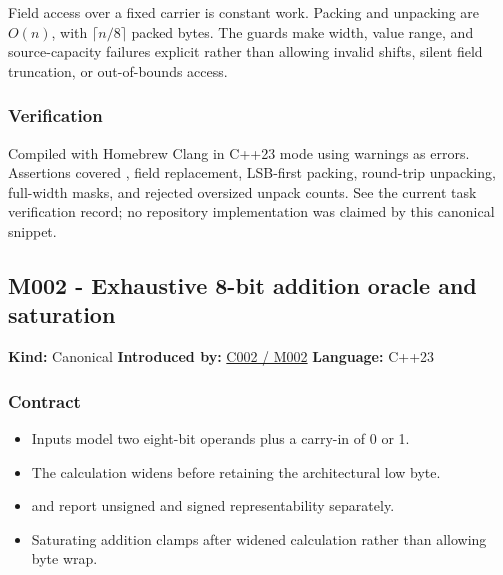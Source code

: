 \hypertarget{appendix-4e2236f53445-cost-and-failure-behavior}{}

Field access over a fixed carrier is constant work. Packing and unpacking are \(O(n)\), with \(\lceil n/8\rceil\) packed bytes. The guards make width, value range, and source-capacity failures explicit rather than allowing invalid shifts, silent field truncation, or out-of-bounds access.

\subsubsection{Verification}\label{appendix-4e2236f53445-verification}

\hypertarget{appendix-4e2236f53445-verification}{}

Compiled with Homebrew Clang in C++23 mode using warnings as errors. Assertions covered , field replacement, LSB-first packing, round-trip unpacking, full-width masks, and rejected oversized unpack counts. See the current task verification record; no repository implementation was claimed by this canonical snippet.

\subsection{M002 - Exhaustive 8-bit addition oracle and saturation}\label{appendix-4e2236f53445-m002---exhaustive-8-bit-addition-oracle-and-saturation}

\hypertarget{appendix-4e2236f53445-m002---exhaustive-8-bit-addition-oracle-and-saturation}{}

\textbf{Kind:} Canonical \textbf{Introduced by:} \hyperref[01-foundations-i-ch001-arithmetic-becomes-a-policy]{C002 / M002} \textbf{Language:} C++23

\subsubsection{Contract}\label{appendix-4e2236f53445-contract-1}

\hypertarget{appendix-4e2236f53445-contract-1}{}

\begin{itemize}
\tightlist
\item
  Inputs model two eight-bit operands plus a carry-in of 0 or 1.
\item
  The calculation widens before retaining the architectural low byte.
\item
   and  report unsigned and signed representability separately.
\item
  Saturating addition clamps after widened calculation rather than allowing byte wrap.
\end{itemize}

